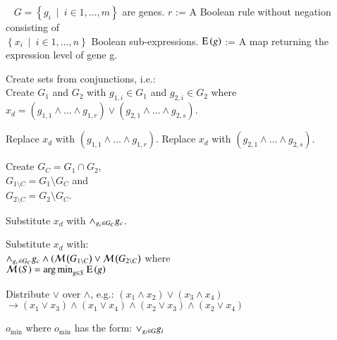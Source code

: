 \begin{AlgFloat}[H]
\begin{Algorithm}
\label{alg:HeuristicToCNF}
\begin{algorithmic}
~
\INPUT $G = \left\{g_i~\mid~i \in{1, \ldots, m}\right\}$ are genes. 
\INPUT $r$ := A Boolean rule without negation consisting of\\
  $\left\{x_i~\mid~i \in{1, \ldots, n}\right\}$ Boolean sub-expressions.
\INPUT $\operatorname{E}\left(g\right)$ := A map returning the expression level of gene g.
  \State \parbox[t]{\dimexpr\linewidth-\algorithmicindent}{
    Create sets from conjunctions, i.e.:\\
    Create $G_1$ and $G_2$ with $g_{1,i} \in G_1$ 
    and $g_{2,i} \in G_2$ where\\ 
    $x_d = (g_{1,1} \land \ldots \land g_{1,r}) \lor 
    (g_{2,1} \land \ldots \land g_{2,s})$. 
    \strut}
    \State Replace $x_d$ with $(g_{1,1} \land \ldots \land g_{1,r})$.
    \State Replace $x_d$ with $(g_{2,1} \land \ldots \land g_{2,s})$.
    \Else
    \State \parbox[t]{\dimexpr\linewidth-\algorithmicindent}{
      Create $G_C = G_1 \cap G_2$, \\
      $G_{1\setminus C} = G_1 \setminus G_C$ and\\ 
      $G_{2\setminus C} = G_2 \setminus G_C$. 
      \strut}
        \State Substitute $x_d$ with $\land_{g_c \in G_C} g_c$.
      \Else
        \State \parbox[t]{\dimexpr\linewidth-\algorithmicindent}{Substitute $x_d$ with:\\
          $\land_{g_c \in G_C} g_c \land (\mathcal{M}\left(G_{1 \setminus C}\right) \lor 
          \mathcal{M}\left(G_{2\setminus C}\right)$ where\\
          $\mathcal{M}\left(S\right) = \operatorname*{arg\,min}_{g \in S}{\operatorname{E}\left(g\right)}$
          \strut}
      \EndIf
    \EndIf
  \EndIf
  \State \parbox[t]{\dimexpr\linewidth-\algorithmicindent}{
    Distribute $\lor$ over $\land$, e.g.: $(x_1 \land x_2) \lor (x_3 \land x_4)$ \\ 
    $\rightarrow (x_1 \lor x_3) \land (x_1 \lor x_4) \land 
    (x_2 \lor x_3) \land (x_2 \lor x_4)$
    \strut}
\EndWhile
\OUTPUT $o_{\min}$ where $o_{\min}$ has the form: $\lor_{g_i \in G} g_i$
\end{algorithmic} 
\end{Algorithm}
\end{AlgFloat}

